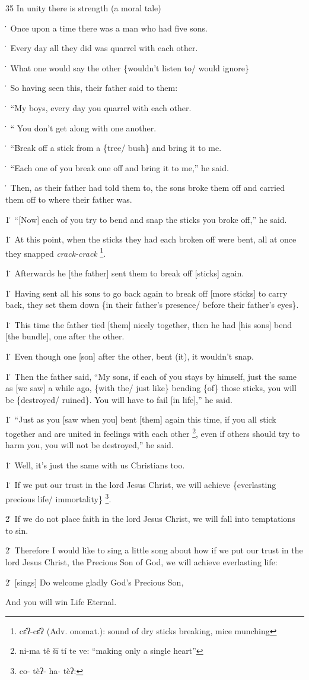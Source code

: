 
35 In unity there is strength (a moral tale)

\. Once upon a time there was a man who had five sons.

\. Every day all they did was quarrel with each other.

\. What one would say the other \{wouldn't listen to/ would ignore\}

\. So having seen this, their father said to them:

\. ``My boys, every day you quarrel with each other.

\. `` You don't get along with one another.

\. ``Break off a stick from a \{tree/ bush\} and bring it to me.

\. ``Each one of you break one off and bring it to me,'' he said.

\. Then, as their father had told them to, the sons broke them off and carried
them off to where their father was.

1\. ``[Now] each of you try to bend and snap the sticks you broke off,'' he said.

1\. At this point, when the sticks they had each broken off were bent, all at once
they snapped \textit{crack-crack} \footnote{cɛ̂ʔ-cɛ̂ʔ (Adv. onomat.): sound of dry sticks breaking, mice munching}.

1\. Afterwards he [the father] sent them to break off [sticks] again.

1\. Having sent all his sons to go back again to break off [more sticks] to carry
back, they set them down \{in their father's presence/ before their father's eyes\}.

1\. This time the father tied [them] nicely together, then he had [his sons] bend
[the bundle], one after the other.

1\. Even though one [son] after the other, bent (it), it wouldn't snap.

1\. Then the father said, ``My sons, if each of you stays by himself, just the
same as [we saw] a while ago, \{with the/ just like\} bending \{of\} those sticks,
you will be \{destroyed/ ruined\}.  You will have to fail [in life],'' he said.

1\. ``Just as you [saw when you] bent [them] again this time, if you all stick
together and are united in feelings with each other \footnote{ni-ma  tê  šī   tí  te  ve: ``making only a single heart''}, even if others should
try to harm you, you will not be destroyed,'' he said.

1\. Well, it's just the same with us Christians too.

1\. If we put our trust in the lord Jesus Christ, we will achieve \{everlasting
precious life/ immortality\} \footnote{co-  tèʔ-  ha-  tèʔ:}.

2\. If we do not place faith in the lord Jesus Christ, we will fall into temptations
to sin.

2\. Therefore I would like to sing a little song about how if we put our trust
in the lord Jesus Christ, the Precious Son of God, we will achieve everlasting
life:

2\. [sings] Do welcome gladly God's Precious Son,

And you will win Life Eternal.

